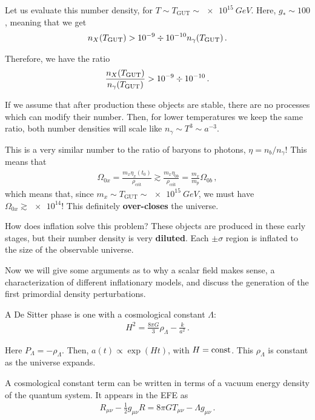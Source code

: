 \documentclass[main.tex]{subfiles}
\begin{document}
Let us evaluate this number density, for \(T \sim T _{\text{GUT}} \sim \SI{e15}{GeV}\).
Here, \(g_* \sim 100\), meaning that we get 
%
\begin{align}
n_X (T _{\text{GUT}}) > \num{e-9} \divisionsymbol \num{e-10} n_\gamma (T _{\text{GUT}})
\,.
\end{align}

Therefore, we have the ratio 
%
\begin{align}
\frac{n_X (T _{\text{GUT}})}{n_\gamma (T _{\text{GUT}})} > \num{e-9} \divisionsymbol \num{e-10}
\,.
\end{align}

If we assume that after production these objects are stable, there are no processes which can modify their number. Then, for lower temperatures we keep the same ratio, both number densities will scale like \(n_\gamma \sim T^3 \sim a^{-3}\). 

This is a very similar number to the ratio of baryons to photons, \(\eta = n_b / n_\gamma \)! 
This means that 
%
\begin{align}
\Omega_{0x} = \frac{m_x \eta _x(t_0 )}{\rho _{\text{crit}}}
\gtrsim \frac{m_x \eta_{0b}}{\rho _{\text{crit}}} = \frac{m_x}{m_p}  \Omega_{0b}
\,,
\end{align}
%
which means that, since \(m_x \sim T _{\text{GUT}} \sim \SI{e15}{GeV}\), we must have \(\Omega_{0x} \gtrsim \num{e14}\)! This definitely \textbf{over-closes} the universe.

How does inflation solve this problem? These objects are produced in these early stages, but their number density is very \textbf{diluted}. 
Each \(\pm \sigma \) region is inflated to the size of the observable universe. 

Now we will give some arguments as to why a scalar field makes sense, a characterization of different inflationary models, and discuss the generation of the first primordial density perturbations. 

A De Sitter phase is one with a cosmological constant \(\Lambda \): 
%
\begin{align}
H^2= \frac{8 \pi G}{3} \rho _\Lambda - \frac{k}{a^2}
\,.
\end{align}
 
Here \(P_\Lambda = - \rho _\Lambda \). 
Then, \(a(t) \propto \exp(Ht)\), with \(H = \text{const}\). This \(\rho _\Lambda\) is constant as the universe expands. 

A cosmological constant term can be written in terms of a vacuum energy density of the quantum system. It appears in the EFE as 
%
\begin{align}
R_{\mu \nu } - \frac{1}{2} g_{\mu \nu } R = 8 \pi G T_{\mu \nu } - \Lambda g_{\mu \nu }
\,.
\end{align}
\end{document}
